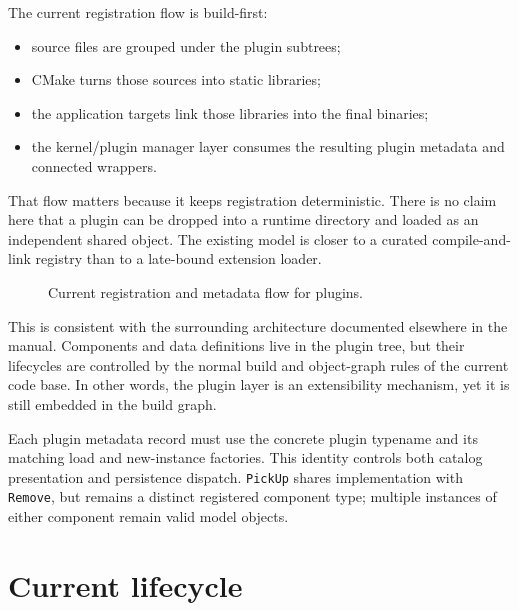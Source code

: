 The current registration flow is build-first:
\begin{itemize}
 \item source files are grouped under the plugin subtrees;
 \item CMake turns those sources into static libraries;
 \item the application targets link those libraries into the final binaries;
 \item the kernel/plugin manager layer consumes the resulting plugin
   metadata and connected wrappers.
\end{itemize}

That flow matters because it keeps registration deterministic. There is no
claim here that a plugin can be dropped into a runtime directory and loaded as
an independent shared object. The existing model is closer to a curated
compile-and-link registry than to a late-bound extension loader.

\begin{figure}[htbp]
\caption{Current registration and metadata flow for plugins.}
\label{fig:plugin-registration-flow}
\end{figure}

This is consistent with the surrounding architecture documented elsewhere in
the manual. Components and data definitions live in the plugin tree, but their
lifecycles are controlled by the normal build and object-graph rules of the
current code base. In other words, the plugin layer is an extensibility
mechanism, yet it is still embedded in the build graph.

Each plugin metadata record must use the concrete plugin typename and its matching load and new-instance
factories. This identity controls both catalog presentation and persistence dispatch. \texttt{PickUp}
shares implementation with \texttt{Remove}, but remains a distinct registered component type; multiple
instances of either component remain valid model objects.

\section{Current lifecycle}
\label{sec:plugin-current-lifecycle}

